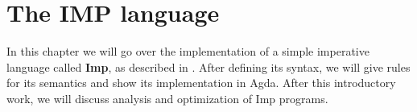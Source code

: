\chapter{The IMP language}

In this chapter we will go over the implementation of a simple imperative language
called \textbf{Imp}, as described in \cite{logical-foundations}. After defining
its syntax, we will give rules for its semantics and show its implementation in
Agda. After this introductory work, we will discuss analysis and optimization of
Imp programs.





